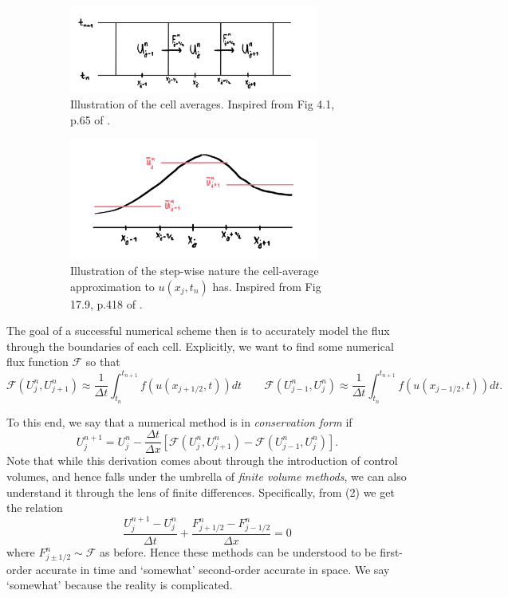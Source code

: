 \documentclass{myproject}
\begin{document}
\begin{figure}[h]
    \centering
    \begin{subfigure}[b]{0.8\textwidth}
        \centering
        \includegraphics[width=0.90\textwidth]{control_volumes.png}
        \caption{Illustration of the cell averages. Inspired from Fig 4.1, p.65 of \cite{leveque2002}.}
    \end{subfigure}

    \vspace{\floatsep}

    \begin{subfigure}{0.8\textwidth}
        \centering
        \includegraphics[width=0.90\textwidth]{step-wise_approx.png}
        \caption{Illustration of the step-wise nature the cell-average approximation to $u(x_j,t_n)$ has. Inspired from Fig 17.9, p.418 of \cite{iserles2009}.}
    \end{subfigure}
    \caption{}
\end{figure}

The goal of a successful numerical scheme then is to accurately model the flux through the boundaries of each cell. Explicitly, we want to find some numerical flux function $\mathcal{F}$ so that 
\[
    \mathcal{F}(U_j^n, U_{j+1}^n) \approx \frac{1}{\Delta t} \int_{t_n}^{t_{n+1}} f(u(x_{j+1/2}, t)) dt \qquad \mathcal{F}(U_{j-1}^n, U_{j}^n) \approx \frac{1}{\Delta t} \int_{t_n}^{t_{n+1}} f(u(x_{j-1/2}, t)) dt.
\]

To this end, we say that a numerical method is in \emph{conservation form} if 
\[
    U_j^{n+1} = U_j^n - \frac{\Delta t}{\Delta x} \left[ \mathcal{F}(U_{j}^{n}, U_{j+1}^{n}) - \mathcal{F}(U_{j-1}^{n}, U_{j}^{n}) \right].
\]
Note that while this derivation comes about through the introduction of control volumes, and hence falls under the umbrella of \emph{finite volume methods}, we can also understand it through the lens of finite differences. Specifically, from (2) we get the relation
\[
    \frac{U_j^{n+1} - U_j^n}{\Delta t} + \frac{F_{j+1/2}^n - F_{j-1/2}^n}{\Delta x} = 0
\]
where $F_{j\pm1/2}^n \sim \mathcal{F}$ as before. Hence these methods can be understood to be first-order accurate in time and `somewhat' second-order accurate in space. We say `somewhat' because the reality is complicated.
\end{document}
